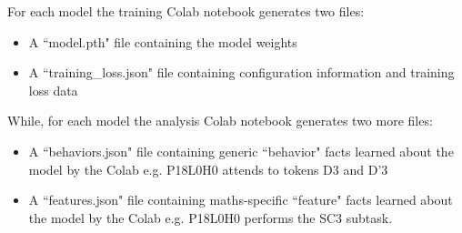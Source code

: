 \documentclass[11pt]{article}
\begin{document}
For each model the training Colab notebook generates two files:
\begin{itemize}
\item A “model.pth" file containing the model weights
\item A “training\_loss.json" file containing configuration information and training loss data
\end{itemize}

While, for each model the analysis Colab notebook generates two more files:
\begin{itemize}
\item A “behaviors.json" file containing generic “behavior" facts learned about the model by the Colab e.g. P18L0H0 attends to tokens D3 and D'3
\item A “features.json" file containing maths-specific “feature" facts learned about the model by the Colab e.g. P18L0H0 performs the SC3 subtask.
\end{itemize}
\end{document}
